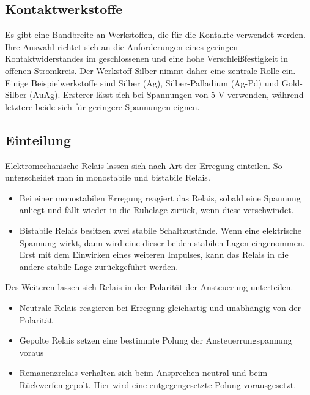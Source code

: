 \subsection*{Kontaktwerkstoffe}
Es gibt eine Bandbreite an Werkstoffen, die für die Kontakte verwendet werden. Ihre Auswahl richtet sich an die Anforderungen eines geringen Kontaktwiderstandes im geschlossenen und eine hohe Verschleißfestigkeit in offenen Stromkreis. Der Werkstoff Silber nimmt daher eine zentrale Rolle ein. Einige Beispielwerkstoffe sind Silber (Ag), Silber-Palladium (Ag-Pd) und Gold-Silber (AuAg). Ersterer lässt sich bei Spannungen von 5 V verwenden, während letztere beide sich für geringere Spannungen eignen. \cite{Bohmer:2018}

\subsection*{Einteilung}
Elektromechanische Relais lassen sich nach Art der Erregung einteilen. So unterscheidet man in monostabile und bistabile Relais. 
\begin{itemize}
	\item Bei einer monostabilen Erregung reagiert das Relais, sobald eine Spannung anliegt und fällt wieder in die Ruhelage zurück, wenn diese verschwindet. 
	\item Bistabile Relais besitzen zwei stabile Schaltzustände. Wenn eine elektrische Spannung wirkt, dann wird eine dieser beiden stabilen Lagen eingenommen. Erst mit dem Einwirken eines weiteren Impulses, kann das Relais in die andere stabile Lage zurückgeführt werden.
\end{itemize}

Des Weiteren lassen sich Relais in der Polarität der Ansteuerung unterteilen. 
\begin{itemize}
	\item Neutrale Relais reagieren bei Erregung gleichartig und unabhängig von der Polarität 
	\item Gepolte Relais setzen eine bestimmte Polung der Ansteuerrungspannung voraus
	\item Remanenzrelais verhalten sich beim Ansprechen neutral und beim Rückwerfen gepolt. Hier wird eine entgegengesetzte Polung vorausgesetzt. 
\end{itemize}

